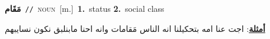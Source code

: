 \documentclass[10pt,a4paper,twoside]{article} %
\begin{document}
\begin{multicols}{2}
{\setlength\topsep{0pt}\textbf{\foreignlanguage{arabic}{مَقَام}}\ {\color{gray}\texttt{//}\color{black}}\ \textsc{noun}\ [m.]\ \textbf{1.}~status  \textbf{2.}~social class\  \begin{flushright}\color{gray}\foreignlanguage{arabic}{\textbf{\underline{\foreignlanguage{arabic}{أمثلة}}}: اجت عنا امه بتحكيلنا انه الناس مَقامات وانه احنا مابنلبق نكون نسايبهم}\end{flushright}\color{black}} \vspace{2mm}

\end{multicols}
\end{document}
